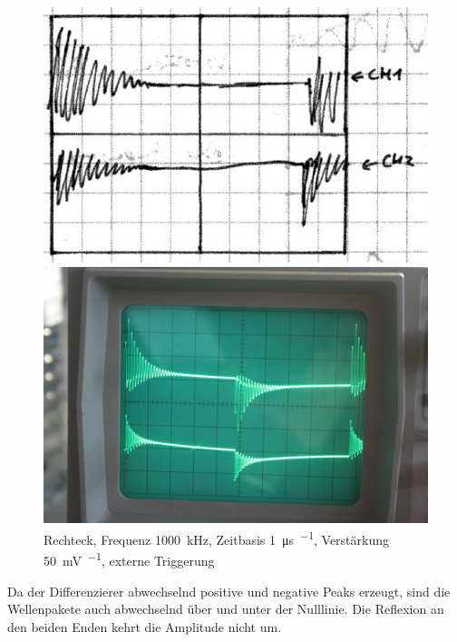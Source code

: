 \begin{figure}[htbp]
	\centering
	\begin{minipage}{.45\linewidth}
	\includegraphics[width=\linewidth]{Skizzen/IMG_0757-1500.jpg}
	\end{minipage}
	\hfill
	\begin{minipage}{.45\linewidth}
	\includegraphics[width=\linewidth]{Fotos/IMG_0757-1500.jpg}
	\end{minipage}
	\caption{%
		Rechteck, Frequenz \SI{1000}{\kilo\hertz}, Zeitbasis \SI{1}{\micro\second\per\division}, Verstärkung \SI{50}{\milli\volt\per\division}, externe Triggerung
	}
	\label{fig:0757}
\end{figure}

Da der Differenzierer abwechselnd positive und negative Peaks erzeugt, sind die
Wellenpakete auch abwechselnd über und unter der Nulllinie. Die Reflexion an
den beiden Enden kehrt die Amplitude nicht um.

